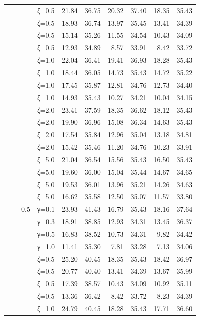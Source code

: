 \begin{table}[htbp]
\begin{tabular}{ll r l  rr  rr  rr}
  &  &  & ζ=0.5 & 21.84 & 36.75 & 20.32 & 37.40 & 18.35 & 35.43 \\
  &  &  & ζ=0.5 & 18.93 & 36.74 & 13.97 & 35.45 & 13.41 & 34.39 \\
  &  &  & ζ=0.5 & 15.14 & 35.26 & 11.55 & 34.54 & 10.43 & 34.09 \\
  &  &  & ζ=0.5 & 12.93 & 34.89 & 8.57 & 33.91 & 8.42 & 33.72 \\
  &  &  & ζ=1.0 & 22.04 & 36.41 & 19.41 & 36.93 & 18.28 & 35.43 \\
  &  &  & ζ=1.0 & 18.44 & 36.05 & 14.73 & 35.43 & 14.72 & 35.22 \\
  &  &  & ζ=1.0 & 17.45 & 35.87 & 12.81 & 34.76 & 12.73 & 34.40 \\
  &  &  & ζ=1.0 & 14.93 & 35.43 & 10.27 & 34.21 & 10.04 & 34.15 \\
  &  &  & ζ=2.0 & 23.41 & 37.59 & 18.35 & 36.62 & 18.12 & 35.43 \\
  &  &  & ζ=2.0 & 19.90 & 36.96 & 15.08 & 36.34 & 14.63 & 35.43 \\
  &  &  & ζ=2.0 & 17.54 & 35.84 & 12.96 & 35.04 & 13.18 & 34.81 \\
  &  &  & ζ=2.0 & 15.42 & 35.46 & 11.20 & 34.76 & 10.23 & 33.91 \\
  &  &  & ζ=5.0 & 21.04 & 36.54 & 15.56 & 35.43 & 16.50 & 35.43 \\
  &  &  & ζ=5.0 & 19.60 & 36.00 & 15.04 & 35.44 & 14.67 & 34.65 \\
  &  &  & ζ=5.0 & 19.53 & 36.01 & 13.96 & 35.21 & 14.26 & 34.63 \\
  &  &  & ζ=5.0 & 16.62 & 35.58 & 12.50 & 35.07 & 11.57 & 33.80 \\
  &  & 0.5 & γ=0.1 & 23.93 & 41.43 & 16.79 & 35.43 & 18.16 & 37.64 \\
  &  &  & γ=0.3 & 18.91 & 38.85 & 12.93 & 34.31 & 13.45 & 36.37 \\
  &  &  & γ=0.5 & 16.83 & 38.52 & 10.73 & 34.31 & 9.82 & 34.42 \\
  &  &  & γ=1.0 & 11.41 & 35.30 & 7.81 & 33.28 & 7.13 & 34.06 \\
  &  &  & ζ=0.5 & 25.20 & 40.45 & 18.35 & 35.43 & 18.42 & 36.97 \\
  &  &  & ζ=0.5 & 20.77 & 40.40 & 13.41 & 34.39 & 13.67 & 35.99 \\
  &  &  & ζ=0.5 & 17.39 & 38.57 & 10.43 & 34.09 & 10.92 & 35.11 \\
  &  &  & ζ=0.5 & 13.36 & 36.42 & 8.42 & 33.72 & 8.23 & 34.39 \\
  &  &  & ζ=1.0 & 24.79 & 40.45 & 18.28 & 35.43 & 17.71 & 36.60 \\

\end{tabular}
\end{table}

